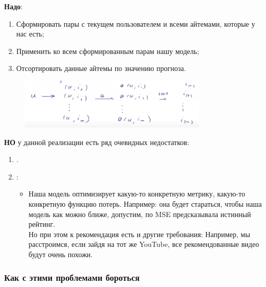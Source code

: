             \textbf{Надо}:
            \begin{enumerate}
                \item Сформировать пары с текущем пользователем и всеми айтемами, которые у нас есть;

                \item Применить ко всем сформированным парам нашу модель;

                \item Отсортировать данные айтемы по значению прогноза.
            \end{enumerate}
            \begin{figure}[H]
                \centering
                \includegraphics[width=0.8\textwidth]{images/14lecture/recommendation_system_1.png}
            \end{figure} 
            \textbf{НО} у данной реализации есть ряд очевидных недостатков:
            \begin{enumerate}
                \item {}. 

                \item {}:
                    \begin{itemize}
                        \item Наша модель оптимизирует какую-то конкретную метрику, какую-то конкретную функцию потерь. Например: она будет стараться, чтобы наша модель как можно ближе, допустим, по MSE предсказывала истинный рейтинг.\\
                        
                        Но при этом к рекомендация есть и другие требования: Например, мы расстроимся, если зайдя на тот же YouTube, все рекомендованные видео будут очень похожи.
                    \end{itemize}
            \end{enumerate}


            
            \subsubsection{Как с этими проблемами бороться}


